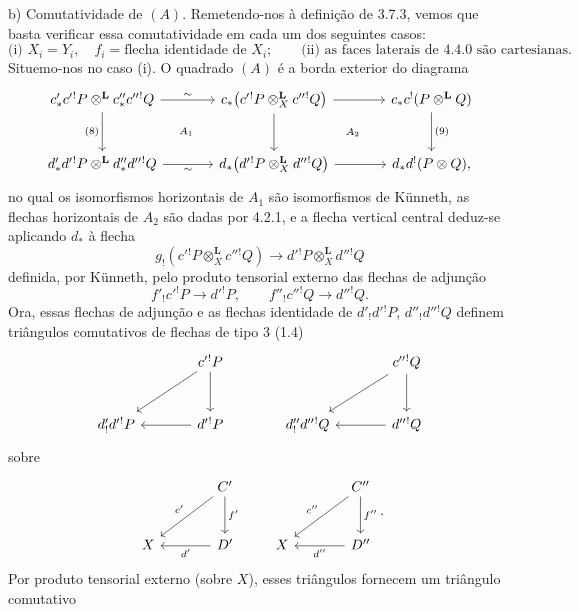 \begin{prooftext}[Demonstração]
b) Comutatividade de $(A)$. Remetendo-nos à definição de 3.7.3, vemos que basta verificar essa comutatividade em cada um dos seguintes casos:
\[
\text{(i) } X_i=Y_i,\quad f_i=\text{flecha identidade de }X_i;\qquad
\text{(ii) as faces laterais de 4.4.0 são cartesianas.}
\]
Situemo-nos no caso (i). O quadrado $(A)$ é a borda exterior do diagrama
\[
\begin{tikzcd}[column sep=large,row sep=large]
c'_*c'{}^!P\otimes^{\mathbf L}c''_*c''{}^!Q
 \arrow[r,"\sim"] \arrow[d,"(8)"'] &
c_*\bigl(c'{}^!P\otimes_X^{\mathbf L}c''{}^!Q\bigr)
 \arrow[r] \arrow[d] &
c_*c^!(P\otimes^{\mathbf L} Q)\arrow[d,"(9)"]\\
d'_*d'{}^!P\otimes^{\mathbf L}d''_*d''{}^!Q
 \arrow[r,"\sim"'] &
d_*\bigl(d'{}^!P\otimes_X^{\mathbf L}d''{}^!Q\bigr)
 \arrow[r] &
d_*d^!(P\otimes Q),
\arrow[from=1-1,to=2-2, phantom, "\scriptstyle A_1"]
\arrow[from=1-2,to=2-3, phantom, "\scriptstyle A_2"]
\end{tikzcd}
\]
no qual os isomorfismos horizontais de $A_1$ são isomorfismos de Künneth, as flechas horizontais de $A_2$ são dadas por 4.2.1, e a flecha vertical central deduz-se aplicando $d_*$ à flecha
\[
g_!(c'{}^!P\otimes_X^{\mathbf L}c''{}^!Q)\longrightarrow d'{}^!P\otimes_X^{\mathbf L}d''{}^!Q
\]
definida, por Künneth, pelo produto tensorial externo das flechas de adjunção
\[
f'_!c'{}^!P\longrightarrow d'{}^!P,\qquad
f''_!c''{}^!Q\longrightarrow d''{}^!Q.
\]
Ora, essas flechas de adjunção e as flechas identidade de $d'_!d'{}^!P$, $d''_!d''{}^!Q$ definem triângulos comutativos de flechas de tipo $3$ (1.4)
\[
\begin{tikzcd}[column sep=large,row sep=large]
& c'{}^!P \arrow[d] \arrow[dl] & & c''{}^!Q \arrow[d]\arrow[dl]\\
d'_!d'{}^!P & d'{}^!P\arrow[l] & d''_!d''{}^!Q & d''{}^!Q\arrow[l]
\end{tikzcd}
\]
sobre
\[
\begin{tikzcd}[column sep=large,row sep=large]
& C' \arrow[d,"f'"] \arrow[dl,"c'"']\\
X & D'\arrow[l,"d'"]
\end{tikzcd}
\qquad
\begin{tikzcd}[column sep=large,row sep=large]
& C'' \arrow[d,"f''"] \arrow[dl,"c''"']\\
X & D''\arrow[l,"d''"]
\end{tikzcd}.
\]
Por produto tensorial externo (sobre $X$), esses triângulos fornecem um triângulo comutativo
\[
\begin{tikzcd}[column sep=huge,row sep=large]

\end{tikzcd}\]
\end{prooftext}
